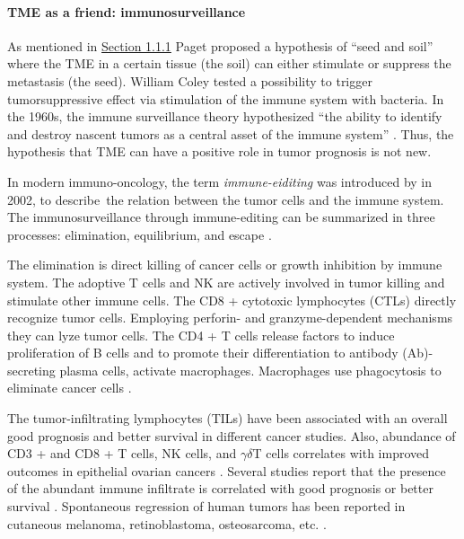 \documentclass[12pt,]{book}
\let\oldparagraph\paragraph
\renewcommand{\paragraph}[1]{\oldparagraph{#1}\mbox{}}
\theoremstyle{definition}
\theoremstyle{definition}
\theoremstyle{definition}
\theoremstyle{remark}
\begin{document}
\hypertarget{tme-as-a-friend-immunosurveillance}{%
\paragraph{TME as a friend:
immunosurveillance}\label{tme-as-a-friend-immunosurveillance}}

As mentioned in \protect\hyperlink{hist}{Section 1.1.1} Paget proposed a
hypothesis of ``seed and soil'' where the TME in a certain tissue (the
soil) can either stimulate or suppress the metastasis (the seed).
William Coley tested a possibility to trigger tumorsuppressive effect
via stimulation of the immune system with bacteria. In the 1960s, the
immune surveillance theory hypothesized ``the ability to identify and
destroy nascent tumors as a central asset of the immune system''
\citep{Sebeok1976, Burnet1970}. Thus, the hypothesis that TME can have a
positive role in tumor prognosis is not new.

In modern immuno-oncology, the term \emph{immune-eiditing} was
introduced by \citet{Dunn2002} in 2002, to describe~the relation between
the tumor cells and the immune system. The immunosurveillance through
immune-editing can be summarized in three processes: elimination,
equilibrium, and escape \citep{Dunn2002}.

The elimination is direct killing of cancer cells or growth inhibition
by immune system. The adoptive T cells and NK are actively involved in
tumor killing and stimulate other immune cells. The CD8 + cytotoxic
lymphocytes (CTLs) directly recognize tumor cells. Employing perforin-
and granzyme-dependent mechanisms they can lyze tumor cells. The CD4 + T
cells release factors to induce proliferation of B cells and to promote
their differentiation to antibody (Ab)-secreting plasma cells, activate
macrophages. Macrophages use phagocytosis to eliminate cancer cells
\citep{Vesely2011}.

The tumor-infiltrating lymphocytes (TILs) have been associated with an
overall good prognosis and better survival in different cancer studies.
Also, abundance of CD3 + and CD8 + T cells, NK cells, and
\(\gamma\delta\)T cells correlates with improved outcomes in epithelial
ovarian cancers \citep{Marquez-Medina2012}. Several studies report that
the presence of the abundant immune infiltrate is correlated with good
prognosis or better survival
\citep{Kornstein1983, Baxevanis1994, Naito1998, Pages2005}. Spontaneous
regression of human tumors has been reported in cutaneous melanoma,
retinoblastoma, osteosarcoma, etc. \citep{Aris2012}.
\end{document}
